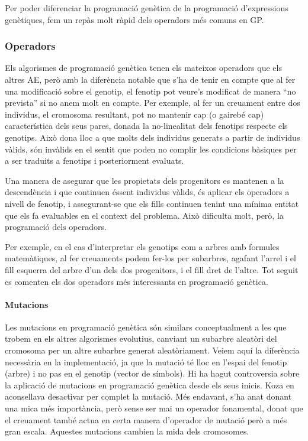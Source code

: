 Per poder diferenciar la programació genètica de la programació d'expressions
genètiques, fem un repàs molt ràpid dels operadors més comuns en GP.

\subsubsection{Operadors} %
\label{ssub:operadors}

Els algorismes de programació genètica tenen els mateixos operadors que els
altres AE, però amb la diferència notable que s'ha de tenir en compte que al fer
una modificació sobre el genotip, el fenotip pot veure's modificat de manera
``no prevista'' si no anem molt en compte.  Per exemple, al fer un creuament
entre dos individus, el cromosoma resultant, pot no mantenir cap (o gairebé
cap) característica dels seus pares, donada la no-linealitat dels fenotips
respecte els genotips.  Això dona lloc a que molts dels individus generats a
partir de individus vàlids, són invàlids en el sentit que poden no complir les
condicions bàsiques per a ser traduits a fenotips i posteriorment evaluats.

Una manera de asegurar que les propietats dels progenitors es mantenen a la
descendència i que continuen éssent individus vàlids, és aplicar els operadors
a nivell de fenotip, i assegurant-se que els fills continuen tenint una mínima
entitat que els fa evaluables en el context del problema.  Això dificulta molt,
però, la programació dels operadors.

Per exemple, en el cas d'interpretar els genotips com a arbres amb formules
matemàtiques, al fer creuaments podem fer-los per subarbres, agafant l'arrel i
el fill esquerra del arbre d'un dels dos progenitors, i el fill dret de l'altre.
Tot seguit es comenten els dos operadors més interessants en programació
genètica.

\paragraph{Mutacions} %
\label{par:Mutacions}
Les mutacions en programació genètica són similars conceptualment a les que
trobem en els altres algorismes evolutius, canviant un subarbre aleatòri del
cromosoma per un altre subarbre generat aleatòriament.  Veiem aquí la diferència
necessària en la implementació, ja que la mutació té lloc en l'espai del fenotip
(arbre) i no pas en el genotip (vector de símbols).  Hi ha hagut controversia
sobre la aplicació de mutacions en programació genètica desde els seus inicis.
Koza en \cite{koza:92} aconsellava desactivar per complet la mutació.   Més
endavant, s'ha anat donant una mica més importància, però sense ser mai un
operador fonamental, donat que el creuament també actua en certa manera
d'operador de mutació però a més gran escala.  Aquestes mutacions cambien la
mida dels cromosomes.

